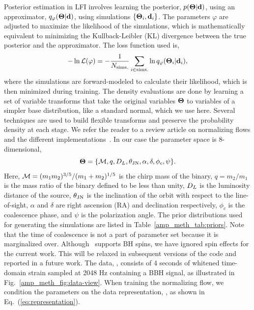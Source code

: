 \begin{refsection}
Posterior estimation in LFI involves learning the posterior, $p(\mathbf{\Theta} \vert \mathbf{d})$, using an approximator, $q_{\varphi}(\mathbf{\Theta} \vert \mathbf{d})$, using simulations $\{\mathbf{\Theta}_i, \mathbf{d}_i\}$. 
The parameters $\varphi$ are adjusted to maximize the likelihood of the simulations, which is mathematically equivalent to minimizing the Kullback-Leibler (KL) divergence between the true posterior and the approximator. 
The loss function used is,
\begin{equation}
    - \ln \mathcal{L}(\varphi) = - \frac{1}{N_{\mathrm{sims.}}}\sum_{i \in \mathrm{sims.}} \ln q_{\varphi}(\mathbf{\Theta}_i \vert \mathbf{d}_i),
    \label{eq:log_likelihood}
\end{equation}
where the simulations are forward-modeled to calculate their likelihood, which is then minimized during training.
The density evaluations are done by learning a set of variable transforms that take the original variables $\mathbf{\Theta}$ to variables of a simpler base distribution, like a standard normal, which we use here. 
Several techniques are used to build flexible transforms and preserve the probability density at each stage. 
We refer the reader to a review article on normalizing flows and the different implementations~\cite{papamakarios2021normalizing}.
In our case the parameter space is 8-dimensional,
\begin{equation}
    \mathbf{\Theta} = \{\mathcal{M}, q, D_L, \theta_{\mathrm{JN}}, \alpha, \delta, \phi_c, \psi \}.
    \label{eq:parameters}
\end{equation}
Here, $\mathcal{M} = (m_1m_2)^{3/5}/(m_1 + m_2)^{1/5}$ is the chirp mass of the binary, $q = m_2/m_1$ is the mass ratio of the binary defined to be less than unity, $D_L$ is the luminosity distance of the source, $\theta_{\mathrm{JN}}$ is the inclination of the orbit with respect to the line-of-sight, $\alpha$ and $\delta$ are right ascension (RA) and declination respectively, $\phi_c$ is the coalescence phase, and $\psi$ is the polarization angle. 
The prior distributions used for generating the simulations are listed in Table~\ref{amp_meth_tab:priors}.
Note that the time of coalescence is not a part of parameter set because it is marginalized over.
Although \phenomd~supports BH spins, we have ignored spin effects for the current work. 
This will be relaxed in subsequent versions of the code and reported in a future work. The data, \data, consists of 4 seconds of whitened time-domain strain sampled at 2048 Hz containing a BBH signal, as illustrated in Fig.~\ref{amp_meth_fig:data-view}. 
When training the normalizing flow, we condition the parameters on the data representation, \smallgamma, as shown in Eq.~(\ref{eq:representation}). 

\end{refsection}
